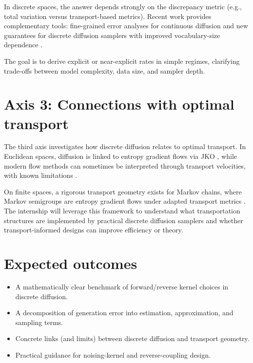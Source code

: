 \documentclass[11pt]{article}
\begin{document}
In discrete spaces, the answer depends strongly on the discrepancy metric (e.g., total variation versus transport-based metrics). Recent work provides complementary tools: fine-grained error analyses for continuous diffusion \citep{hurault2025gaussian} and new guarantees for discrete diffusion samplers with improved vocabulary-size dependence \citep{liang2025discrete}.

The goal is to derive explicit or near-explicit rates in simple regimes, clarifying trade-offs between model complexity, data size, and sampler depth.

\section{Axis 3: Connections with optimal transport}
The third axis investigates how discrete diffusion relates to optimal transport.
In Euclidean spaces, diffusion is linked to entropy gradient flows via JKO \citep{jordan1998jko}, while modern flow methods can sometimes be interpreted through transport velocities, with known limitations \citep{hertrich2025rfot}.

On finite spaces, a rigorous transport geometry exists for Markov chains, where Markov semigroups are entropy gradient flows under adapted transport metrics \citep{maas2011gradient,mielke2011markov}.
The internship will leverage this framework to understand what transportation structures are implemented by practical discrete diffusion samplers and whether transport-informed designs can improve efficiency or theory.

\section{Expected outcomes}
\begin{itemize}[leftmargin=*]
\item A mathematically clear benchmark of forward/reverse kernel choices in discrete diffusion.
\item A decomposition of generation error into estimation, approximation, and sampling terms.
\item Concrete links (and limits) between discrete diffusion and transport geometry.
\item Practical guidance for noising-kernel and reverse-coupling design.
\end{itemize}



\end{document}
